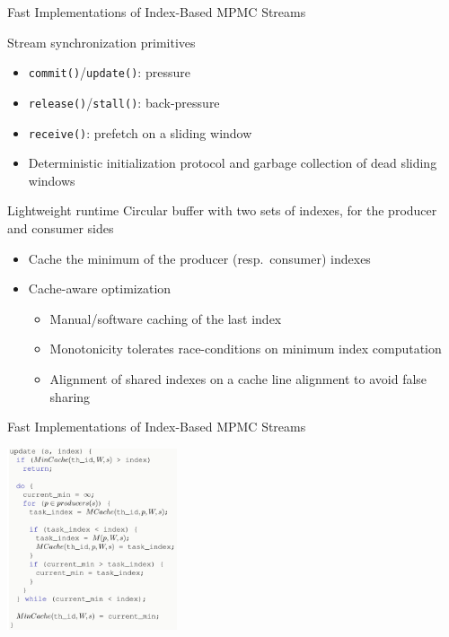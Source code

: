 \documentclass[xcolor=dvipsnames,9pt,mathserif]{beamer}
\newcommand{\code}[1]{\texttt{\color{darkgreen}#1}}
\begin{document}
\begin{frame}[t]{Fast Implementations of Index-Based MPMC Streams}
  \centerline{\scalebox{.6}{}}

  \begin{block}{Stream synchronization primitives}
    \begin{itemize}
    \item \code{commit()}/\code{update()}: pressure
    \item \code{release()}/\code{stall()}: back-pressure
    \item \code{receive()}: prefetch on a sliding window
    \item Deterministic initialization protocol and
      garbage collection of dead sliding windows
    \end{itemize}
  \end{block}

  \begin{block}{Lightweight runtime}
    Circular buffer with two sets of indexes, for the producer and
    consumer sides

    \begin{itemize}
    \item Cache the minimum of the producer (resp.\ consumer) indexes
    \item Cache-aware optimization
      \begin{itemize}
      \item Manual/software caching of the last index
      \item Monotonicity tolerates race-conditions on minimum index computation
      \item Alignment of shared indexes on a cache line alignment to
        avoid false sharing
      \end{itemize}
    \end{itemize}
  \end{block}
\end{frame}

\begin{frame}[t]{Fast Implementations of Index-Based MPMC Streams}
  \centerline{\scalebox{.6}{}}

  \bigskip
  \centerline{\includegraphics[width=5cm]{cache_optimized_update}}
\end{frame}
\end{document}
